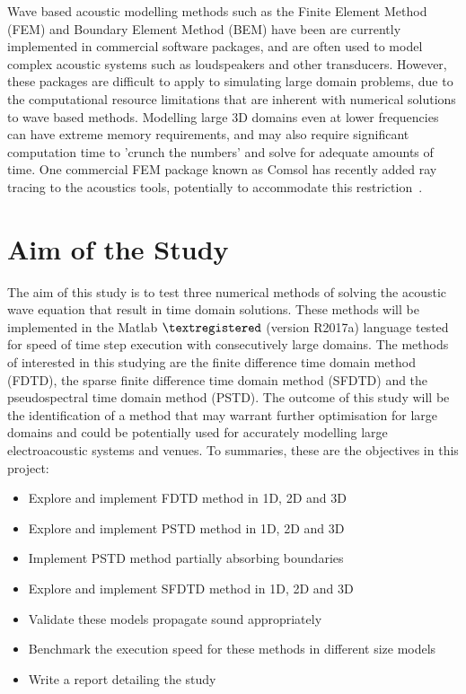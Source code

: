 Wave based acoustic modelling methods such as the Finite Element Method (FEM) and Boundary Element Method (BEM) have been are currently implemented in commercial software packages, and are often used to model complex acoustic systems such as loudspeakers and other transducers. However, these packages are difficult to apply to simulating large domain problems, due to the computational resource limitations that are inherent with numerical solutions to wave based methods. Modelling large 3D domains even at lower frequencies can have extreme memory requirements, and may also require significant computation time to 'crunch the numbers' and solve for adequate amounts of time. One commercial FEM package known as Comsol has recently added ray tracing to the acoustics tools, potentially to accommodate this restriction~\cite{Jensen2016}.\\

\section{Aim of the Study}

The aim of this study is to test three numerical methods of solving the acoustic wave equation that result in time domain solutions. These methods will be implemented in the Matlab $\textregistered $ (version R2017a) language tested for speed of time step execution with consecutively large domains. The methods of interested in this studying are the finite difference time domain method (FDTD), the sparse finite difference time domain method (SFDTD) and the pseudospectral time domain method (PSTD). The outcome of this study will be the identification of a method that may warrant further optimisation for large domains and could be potentially used for accurately modelling large electroacoustic systems and venues. To summaries, these are the objectives in this project:\\

\begin{itemize}
\item Explore and implement FDTD method in 1D, 2D and 3D
\item Explore and implement PSTD method in 1D, 2D and 3D
\item Implement PSTD method partially absorbing boundaries
\item Explore and implement SFDTD method in 1D, 2D and 3D
\item Validate these models propagate sound appropriately
\item Benchmark the execution speed for these methods in different size models
\item Write a report detailing the study
\end{itemize}

